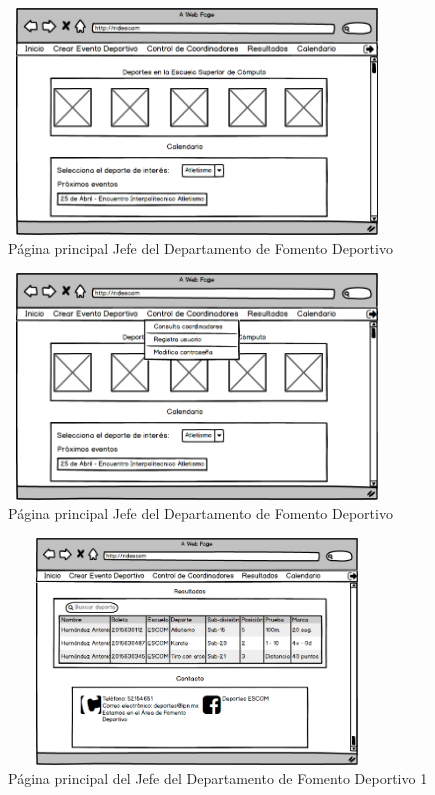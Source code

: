 		\begin{figure}[hbt!]
			\centering
			\includegraphics[width=10cm, height=6cm]{Imagenes/Disenos/p3InicioJefeFD.png}
			\caption{Página principal Jefe del Departamento de Fomento Deportivo}
			\label{IniciogeneralJFD}
		\end{figure}
			\pagebreak
	
		\begin{figure}[hbt!]
			\centering
			\includegraphics[width=10cm, height=6cm]{Imagenes/Disenos/p4InicioJefeFDopcipones.png}
			\caption{Página principal Jefe del Departamento de Fomento Deportivo}
			\label{IniciogeneralJFDopciones}
		\end{figure}
	
		\begin{figure}[hbt!]
			\centering
			\includegraphics[width=10cm, height=6cm]{Imagenes/Disenos/p5InicioJefeFD1.png}
			\caption{Página principal del Jefe del Departamento de Fomento Deportivo 1}
			\label{IniciogeneralJFD1}
		\end{figure}
	

